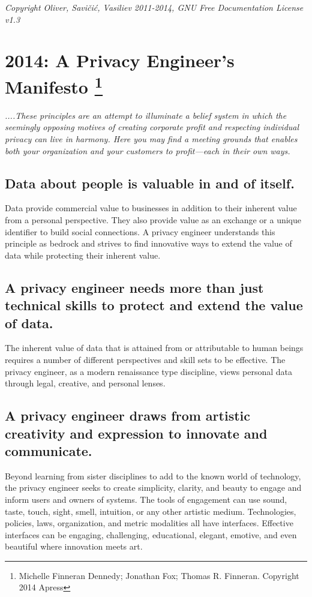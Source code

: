 \documentclass[letterpaper,12pt,english]{sphinxmanual}
\begin{document}
\emph{Copyright Oliver, Savičić, Vasiliev 2011-2014, GNU Free Documentation License v1.3}


\chapter{2014: A Privacy Engineer’s Manifesto \footnote{
Michelle Finneran Dennedy; Jonathan Fox; Thomas R. Finneran. Copyright 2014 Apress
}}
\label{privacy::doc}\label{privacy:a-privacy-engineers-manifesto-1}\label{privacy:index-0}
\emph{....These principles are an attempt to illuminate a belief system in which the seemingly opposing motives of creating corporate profit and respecting individual privacy can live in harmony. Here you may find a meeting grounds that enables both your organization and your customers to profit—each in their own ways.}


\section{Data about people is valuable in and of itself.}
\label{privacy:data-about-people-is-valuable-in-and-of-itself}
Data provide commercial value to businesses in addition to their inherent value from a personal perspective. They also provide value as an exchange or a unique identifier to build social connections. A privacy engineer understands this principle as bedrock and strives to find innovative ways to extend the value of data while protecting their inherent value.


\section{A privacy engineer needs more than just technical skills to protect and extend the value of data.}
\label{privacy:a-privacy-engineer-needs-more-than-just-technical-skills-to-protect-and-extend-the-value-of-data}
The inherent value of data that is attained from or attributable to human beings requires a number of different perspectives and skill sets to be effective. The privacy engineer, as a modern renaissance type discipline, views personal data through legal, creative, and personal lenses.


\section{A privacy engineer draws from artistic creativity and expression to innovate and communicate.}
\label{privacy:a-privacy-engineer-draws-from-artistic-creativity-and-expression-to-innovate-and-communicate}
Beyond learning from sister disciplines to add to the known world of technology, the privacy engineer seeks to create simplicity, clarity, and beauty to engage and inform users and owners of systems. The tools of engagement can use sound, taste, touch, sight, smell, intuition, or any other artistic medium. Technologies, policies, laws, organization, and metric modalities all have interfaces. Effective interfaces can be engaging, challenging, educational, elegant, emotive, and even beautiful where innovation meets art.
\end{document}

